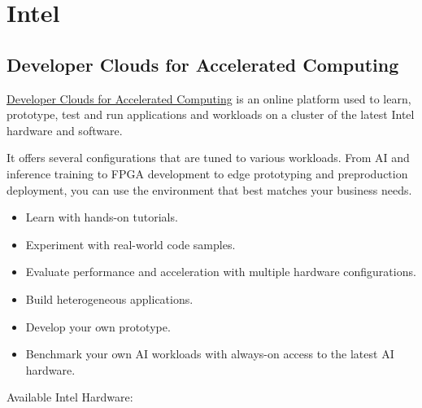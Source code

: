 \documentclass[a4paper]{article}
\begin{document}
    \newpage

    \section{Intel}\label{section: Intel}

    \subsection{Developer Clouds for Accelerated Computing}

    \href{https://www.intel.com/content/www/us/en/developer/tools/devcloud/overview.html}{Developer Clouds for Accelerated Computing} is an online platform used to learn, prototype, test and run applications and workloads on a cluster of the latest Intel hardware and software.\newline

    \noindent
    It offers several configurations that are tuned to various workloads. From AI and inference training to FPGA development to edge prototyping and preproduction deployment, you can use the environment that best matches your business needs.
    \begin{itemize}
        \item Learn with hands-on tutorials.
        \item Experiment with real-world code samples.
        \item Evaluate performance and acceleration with multiple hardware configurations.
        \item Build heterogeneous applications.
        \item Develop your own prototype.
        \item Benchmark your own AI workloads with always-on access to the latest AI hardware.
    \end{itemize}
    Available Intel Hardware:\newline
\end{document}

